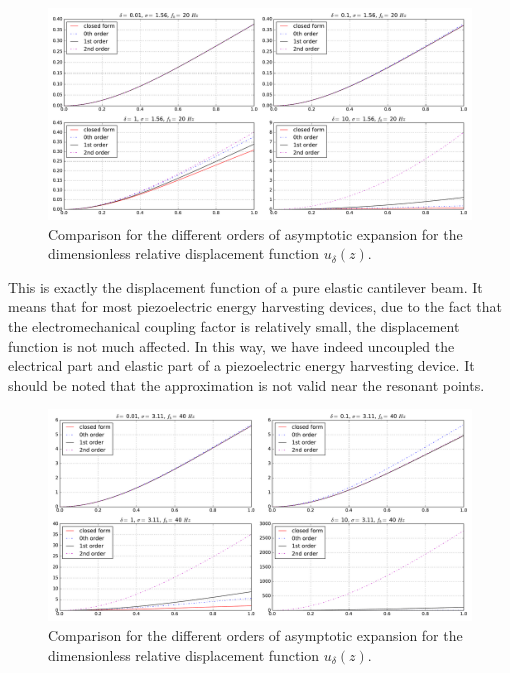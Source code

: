 \documentclass{article}
\begin{document}
\begin{figure}[!htbp]
    \centering
    \includegraphics[width=\textwidth]{./img_eig_asy/fig_sol_analytic_disp_cmp_fr020}
    \caption{Comparison for the different orders of asymptotic expansion for the dimensionless relative displacement function $u_\delta(z)$.}
    \label{fig:fig_sol_analytic_disp_cmp_fr020}
\end{figure}


This is exactly the displacement function of a pure elastic cantilever beam. It means that for most piezoelectric energy harvesting devices, due to the fact that the electromechanical coupling factor is relatively small, the displacement function is not much affected. In this way, we have indeed uncoupled the electrical part and elastic part of a piezoelectric energy harvesting device. It should be noted that the approximation is not valid near the resonant points.





\begin{figure}[!htbp]
    \centering
    \includegraphics[width=\textwidth]{./img_eig_asy/fig_sol_analytic_disp_cmp_fr040}
    \caption{Comparison for the different orders of asymptotic expansion for the dimensionless relative displacement function $u_\delta(z)$.}
    \label{fig:fig_sol_analytic_disp_cmp_fr040}
\end{figure}
\end{document}
